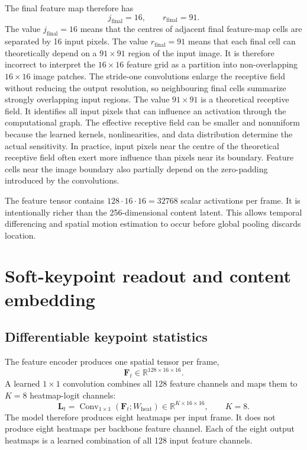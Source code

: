 \documentclass[11pt,a4paper]{article}
\begin{document}
The final feature map therefore has 
\begin{equation} 
	j_{\mathrm{final}}=16, \qquad r_{\mathrm{final}}=91. 
\end{equation} 
The value $j_{\mathrm{final}}=16$ means that the centres of adjacent final feature-map cells are separated by 16 input pixels. The value $r_{\mathrm{final}}=91$ means that each final cell can theoretically depend on a $91\times91$ region of the input image. It is therefore incorrect to interpret the $16\times16$ feature grid as a partition into non-overlapping $16\times16$ image patches. The stride-one convolutions enlarge the receptive field without reducing the output resolution, so neighbouring final cells summarize strongly overlapping input regions. The value $91\times91$ is a theoretical receptive field. It identifies all input pixels that can influence an activation through the computational graph. The effective receptive field can be smaller and nonuniform because the learned kernels, nonlinearities, and data distribution determine the actual sensitivity. In practice, input pixels near the centre of the theoretical receptive field often exert more influence than pixels near its boundary. Feature cells near the image boundary also partially depend on the zero-padding introduced by the convolutions.

The feature tensor contains $128\cdot16\cdot16=32768$ scalar activations per frame. It is intentionally richer than the 256-dimensional content latent. This allows temporal differencing and spatial motion estimation to occur before global pooling discards location.

\section{Soft-keypoint readout and content embedding}
\subsection{Differentiable keypoint statistics}
The feature encoder produces one spatial tensor per frame, 
\begin{equation} 
	\mathbf F_t \in \mathbb{R}^{128\times16\times16}. 
\end{equation} 
A learned $1\times1$ convolution combines all 128 feature channels and maps them to $K=8$ heatmap-logit channels: \begin{equation} 
	\mathbf L_t = \operatorname{Conv}_{1\times1} \left( \mathbf F_t;W_{\mathrm{heat}} \right) \in \mathbb{R}^{K\times16\times16}, \qquad K=8. \label{eq:keypoint-logits} 
\end{equation} 
The model therefore produces eight heatmaps per input frame. It does not produce eight heatmaps per backbone feature channel. Each of the eight output heatmaps is a learned combination of all 128 input feature channels. 
\end{document}
